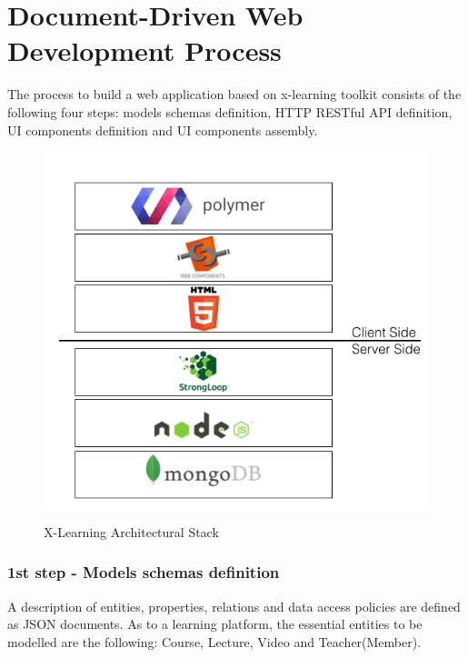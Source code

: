 \section{Document-Driven Web Development Process}
\label{sec:document-driven web_development_process}

The process to build a web application based on x-learning toolkit consists of the following four steps: models schemas definition, HTTP RESTful API definition, UI components definition and UI components  assembly.


\begin{figure}[htb] %
 \centering
 \includegraphics[width=1.0\linewidth]{images/chapter4/XPR_stack.png}\hfill
 \caption[X-learning Architectural Stack]{X-Learning Architectural Stack}
 \label{fig:fourV}
\end{figure}

\subsubsection {1st step - Models schemas definition}
\label{subsec:1st_step_models_schemas_definitio}


A description of entities, properties, relations and data access policies are defined as JSON  documents.
As to a learning platform, the essential entities to be modelled are the following: Course, Lecture, Video and Teacher(Member).

